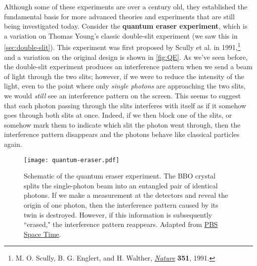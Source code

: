 Although some of these experiments are over a century old, they established the fundamental basis for more advanced theories and experiments that are still being investigated today. 
Consider the \textbf{quantum eraser experiment}, which is a variation on Thomas Young's classic double-slit experiment (we saw this in \autoref{sec:double-slit}). 
This experiment was first proposed by Scully et al. in 1991,\footnote{M. O. Scully, B. G. Englert, and H. Walther, \href{https://www.nature.com/nature/journal/v351/n6322/abs/351111a0.html}{\emph{Nature}} \textbf{351}, 1991.} and a variation on the original design is shown in \autoref{fig:QE}. 
As we've seen before, the double-slit experiment produces an interference pattern when we send a beam of light through the two slits; however, if we were to reduce the intensity of the light, even to the point where only \emph{single photons} are approaching the two slits, we would \emph{still} see an interference pattern on the screen. 
This seems to suggest that each photon passing through the slits interferes with itself as if it somehow goes through both slits at once. 
Indeed, if we then block one of the slits, or somehow mark them to indicate which slit the photon went through, then the interference pattern disappears and the photons behave like classical particles again. 

\begin{figure}[!h]
	\centering
	\texttt{[image: quantum-eraser.pdf]}
	\caption{Schematic of the quantum eraser experiment. 
	The BBO crystal splits the single-photon beam into an entangled pair of identical photons. 
	If we make a measurement at the detectors and reveal the origin of one photon, then the interference pattern caused by its twin is destroyed. 
	However, if this information is subsequently ``erased," the interference pattern reappears. 
	Adapted from \href{https://www.pbs.org/video/pbs-space-time-quantum-eraser/}{PBS Space Time}.
	}
	\label{fig:QE}
\end{figure}


